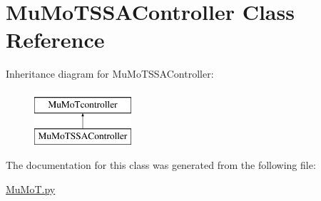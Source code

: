 \hypertarget{class_mu_mo_t_1_1_mu_mo_t_s_s_a_controller}{}\section{Mu\+Mo\+T\+S\+S\+A\+Controller Class Reference}
\label{class_mu_mo_t_1_1_mu_mo_t_s_s_a_controller}
Inheritance diagram for Mu\+Mo\+T\+S\+S\+A\+Controller\+:\begin{figure}[H]
\begin{center}
\leavevmode
\includegraphics[height=2.000000cm]{class_mu_mo_t_1_1_mu_mo_t_s_s_a_controller}
\end{center}
\end{figure}


The documentation for this class was generated from the following file\+:\begin{DoxyCompactItemize}
\item 
\hyperlink{_mu_mo_t_8py}{Mu\+Mo\+T.\+py}\end{DoxyCompactItemize}
